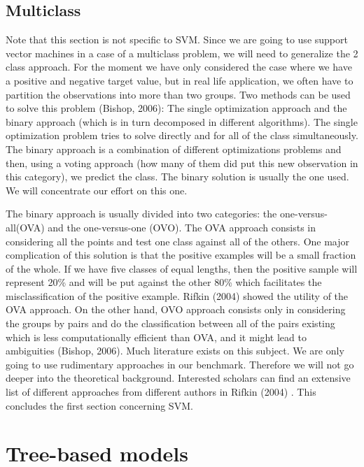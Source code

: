 \documentclass[a4paper,12pt]{article}
\numberwithin{equation}{section}
\begin{document}
\newpage
\subsection{Multiclass}

Note that this section is not specific to SVM. Since we are going to use support vector machines in a case of a multiclass problem, we will need to generalize the 2 class approach. For the moment we have only considered the case where we have a positive and negative target value, but in real life application, we often have to partition the observations into more than two groups. Two methods can be used to solve this problem (Bishop, 2006): The single optimization approach and the binary approach (which is in turn decomposed in different algorithms). The single optimization problem tries to solve directly and for all of the class simultaneously. The binary approach is a combination of different optimizations problems and then, using a voting approach (how many of them did put this new observation in this category), we predict the class. The binary solution is usually the one used. We will concentrate our effort on this one. \par
The binary approach is usually divided into two categories: the one-versus-all(OVA) and the one-versus-one (OVO). The OVA approach consists in considering all the points and test one class against all of the others. One major complication of this solution is that the positive examples will be a small fraction of the whole. If we have five classes of equal lengths, then the positive sample will represent 20\% and will be put against the other 80\% which facilitates the misclassification of the positive example. Rifkin (2004) showed the utility of the OVA approach. On the other hand, OVO approach consists only in considering the groups by pairs and do the classification between all of the pairs existing which is less computationally efficient than OVA, and it might lead to ambiguities (Bishop, 2006). Much literature exists on this subject. We are only going to use rudimentary approaches in our benchmark. Therefore we will not go deeper into the theoretical background. Interested scholars can find an extensive list of different approaches from different authors in Rifkin (2004) . This concludes the first section concerning SVM.



\newpage

\section{Tree-based models}\label{sec:second}
\end{document}
